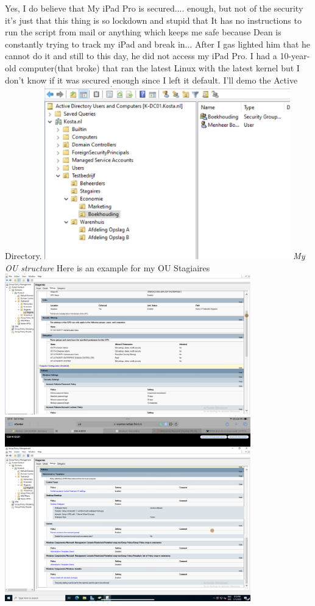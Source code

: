\documentclass[12pt, letterpaper]{article}
\begin{document}
Yes, I do believe that My iPad Pro is secured.... enough, but not of the security it's just that this thing is so lockdown and stupid that It has no instructions to run the script from mail or anything which keeps me safe because Dean is constantly trying to track my iPad and break in... After I gas lighted him that he cannot do it and still to this day, he did not access my iPad Pro. I had a 10-year-old computer(that broke) that ran the latest Linux with the latest kernel but I don't know if it was secured enough since I left it default.
\hfill\break
\hfill\break
I'll demo the Active Directory.
\hfill\break
\includegraphics[width=0.8\textwidth]{fotos/Week 1011/IT hardening/AD/Ou.jpeg}
\hfill\break
\emph{My OU structure}
\hfill\break
\hfill\break
Here is an example for my OU Stagiaires
\includegraphics[width=0.8\textwidth]{fotos/Week 1011/IT hardening/AD/Stagiaire 1.jpeg}
\hfill\break
\hfill\break
\includegraphics[width=0.8\textwidth]{fotos/Week 1011/IT hardening/AD/Stagaires 2.png}
\end{document}
